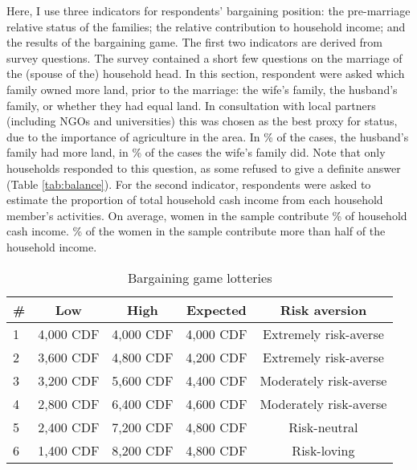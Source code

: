 \documentclass[11pt,a4paper]{scrartcl} %
\begin{document}
Here, I use three indicators for respondents' bargaining position: the pre-marriage relative status of the families; the relative contribution to household income; and the results of the bargaining game. The first two indicators are derived from survey questions. The survey contained a short few questions on the marriage of the (spouse of the) household head. In this section, respondent were asked which family owned more land, prior to the marriage: the wife's family, the husband's family, or whether they had equal land. In consultation with local partners (including NGOs and universities) this was chosen as the best proxy for status, due to the importance of agriculture in the area. In \% of the cases, the husband's family had more land, in \% of the cases the wife's family did. Note that only  households responded to this question, as some refused to give a definite answer (Table \ref{tab:balance}). For the second indicator, respondents were asked to estimate the proportion of total household cash income from each household member's activities. On average, women in the sample contribute \% of household cash income. \% of the women in the sample contribute more than half of the household income.

\begin{table}[h]
	\centering
	\caption{Bargaining game lotteries}
	\label{tab:bargaining}
	\begin{tabular}{l c c c c}
	\toprule
	\# & Low & High & Expected & Risk aversion \\
	\hline
	1 & 4,000 CDF & 4,000 CDF & 4,000 CDF & Extremely risk-averse \\
	2 & 3,600 CDF & 4,800 CDF & 4,200 CDF & Extremely risk-averse \\
	3 & 3,200 CDF & 5,600 CDF & 4,400 CDF & Moderately risk-averse \\
	4 & 2,800 CDF & 6,400 CDF & 4,600 CDF & Moderately risk-averse \\
	5 & 2,400 CDF & 7,200 CDF & 4,800 CDF & Risk-neutral \\
	6 & 1,400 CDF & 8,200 CDF & 4,800 CDF & Risk-loving \\ 
	\bottomrule
	\end{tabular}
\end{table}
\end{document}
